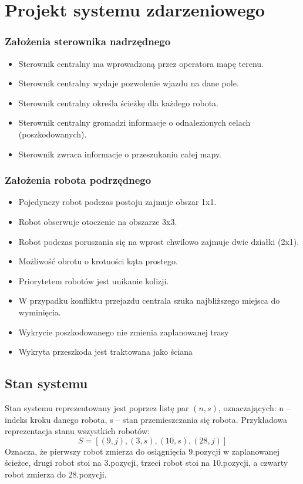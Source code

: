 \section{Projekt systemu zdarzeniowego}
\subsubsection{Założenia sterownika nadrzędnego}
\label{subsec:sterownik_podrzedny_stany}
\begin{itemize}
    \item Sterownik centralny ma wprowadzoną przez operatora mapę terenu.
    \item Sterownik centralny wydaje pozwolenie wjazdu na dane pole.
    \item Sterownik centralny określa ścieżkę dla każdego robota.
    \item Sterownik centralny gromadzi informacje o odnalezionych celach (poszkodowanych).
    \item Sterownik zwraca informacje o przeszukaniu całej mapy.
\end{itemize}

\subsubsection{Założenia robota podrzędnego}
\begin{itemize}
    \item Pojedynczy robot podczas postoju zajmuje obszar 1x1.
    \item Robot obserwuje otoczenie na obszarze 3x3.
    \item Robot podczas poruszania się na wprost chwilowo zajmuje dwie działki (2x1).
    \item Możliwość obrotu o krotności kąta prostego.
    \item Priorytetem robotów jest unikanie kolizji.
    \item W przypadku konfliktu przejazdu centrala szuka najbliższego miejsca do wyminięcia.
    \item Wykrycie poszkodowanego nie zmienia zaplanowanej trasy
    \item Wykryta przeszkoda jest traktowana jako ściana
\end{itemize}

\subsection{Stan systemu}
Stan systemu reprezentowany jest poprzez listę par $(n, s)$, oznaczających: n -- indeks kroku danego robota, s -- stan przemieszczania się robota.
Przykładowa reprezentacja stanu wszystkich robotów: \\
$$S = [(9, j), (3, s), (10, s), (28, j)]$$
Oznacza, że pierwszy robot zmierza do osiągnięcia 9.\@ pozycji w zaplanowanej ścieżce, drugi robot stoi na 3.\@ pozycji, trzeci robot stoi na 10.\@ pozycji, a czwarty robot zmierza do 28.\@ pozycji.

